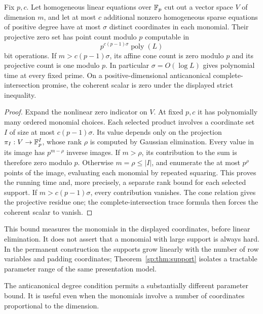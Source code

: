 \begin{theorem}
\label{sp:thm:support}
Fix $p,c$. Let homogeneous linear equations over $\mathbb F_p$ cut out a vector
space $V$ of dimension $m$, and let at most $c$ additional nonzero
homogeneous sparse equations of positive degree have at most
$\sigma$ distinct coordinates in each
monomial. Their projective zero set has point count modulo $p$
computable in
\[
 p^{c(p-1)\sigma}\operatorname{poly}(L)
\]
bit operations. If $m>c(p-1)\sigma$, its affine cone count is zero
modulo $p$ and its projective count is one modulo $p$.
In particular $\sigma=O(\log L)$ gives polynomial time at every fixed
prime. On a positive-dimensional anticanonical complete-intersection
promise, the coherent scalar is zero under the displayed strict
inequality.
\end{theorem}
\begin{proof}
Expand the nonlinear zero indicator on $V$. At fixed $p,c$ it has
polynomially many ordered monomial choices. Each selected product
involves a coordinate set $I$ of size at most $c(p-1)\sigma$.
Its value depends only on the projection
$\pi_I:V\to\mathbb F_p^I$, whose rank $\rho$ is computed by Gaussian
elimination. Every value in its image has $p^{m-\rho}$ inverse images.
If $m>\rho$, its contribution to the sum is therefore zero modulo $p$.
Otherwise $m=\rho\leq|I|$, and enumerate the at most $p^\rho$ points
of the image, evaluating each monomial by repeated squaring.
This proves the running time and, more precisely, a separate rank bound
for each selected support. If $m>c(p-1)\sigma$, every contribution
vanishes. The cone relation gives the projective residue one; the
complete-intersection trace formula then forces the coherent scalar
to vanish.
\end{proof}

This bound measures the monomials in the displayed coordinates, before
linear elimination. It does not assert that a monomial with large
support is always hard. In the permanent construction the supports grow
linearly with the number of row variables and padding coordinates;
Theorem~\ref{sp:thm:support} isolates a tractable parameter range of the
same presentation model.

The anticanonical degree condition permits a substantially different
parameter bound. It is useful even when the monomials involve a number
of coordinates proportional to the dimension.

